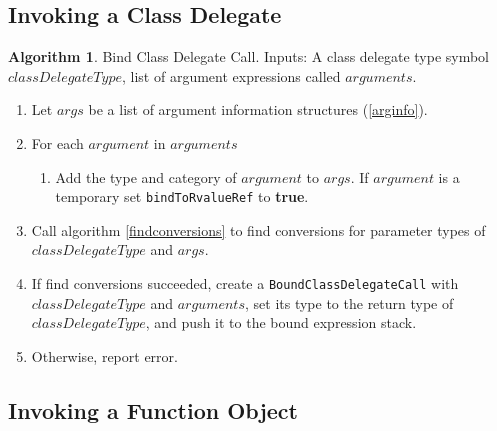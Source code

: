 \documentclass[a4paper,oneside,11pt]{book}
\theoremstyle{definition}
\newtheorem{algo}{Algorithm}[section]
\begin{document}
\subsection{Invoking a Class Delegate}

\begin{algo}\label{bindinvokeclassdelegate} Bind Class Delegate Call.
Inputs: A class delegate type symbol $classDelegateType$, list of argument expressions called $arguments$.
\begin{enumerate}
\item
Let $args$ be a list of argument information structures (\ref{arginfo}).
\item
For each $argument$ in $arguments$
\begin{enumerate}
\item
Add the type and category of $argument$ to $args$. If $argument$ is a temporary set \verb|bindToRvalueRef| to \textbf{true}.
\end{enumerate}
\item
Call algorithm \ref{findconversions} to find conversions for parameter types of $classDelegateType$ and $args$.
\item
If find conversions succeeded, create a \verb|BoundClassDelegateCall| with $classDelegateType$ and $arguments$,
set its type to the return type of $classDelegateType$, and push it to the bound expression stack.
\item
Otherwise, report error.
\end{enumerate}
\end{algo}

\subsection{Invoking a Function Object}
\end{document}
